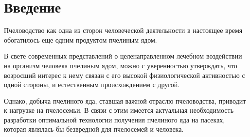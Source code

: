 \section{Введение}

Пчеловодство как одна из сторон человеческой деятельности в настоящее время обогатилось еще одним продуктом \longndash пчелиным ядом.

В свете современных представлений о целенаправленном лечебном воздействии на организм человека пчелиным ядом, можно с уверенностью утверждать, что возросший интерес к нему связан с его высокой физиологической активностью с одной стороны, и естественным происхождением с другой. 

Однако, добыча пчелиного яда, ставшая важной отраслю пчеловодства, приводит к нагрузке на пчелосемьи. В связи с этим имеется актуальная необходимость разработки оптимальной технологии получения пчелиного яда на пасеках, которая являлась бы безвредной для пчелосемей и человека.